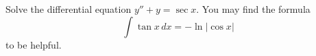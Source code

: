 \documentclass[12pt]{exam}
\begin{document}
    


\newpage


\begin{questions}


    \question[10]  Solve the differential equation $y''+y = \sec x$.     You may find the formula $$\int \tan x \, dx = - \ln |\cos x|$$ to be helpful. 
    \newpage

    
        




\end{questions}
\end{document}
